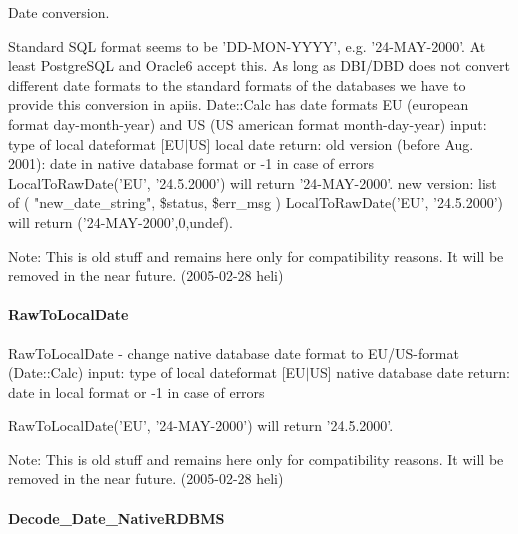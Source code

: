 Date conversion.



Standard SQL format seems to be 'DD-MON-YYYY', e.g. '24-MAY-2000'. At
least PostgreSQL and Oracle6 accept this.
As long as DBI/DBD does not convert different date formats to the standard
formats of the databases we have to provide this conversion in apiis.
Date::Calc has date formats EU (european format day-month-year) and US
(US american format month-day-year)
   input:  type of local dateformat [EU$|$US]
           local date
   return: old version (before Aug. 2001):
           date in native database format or -1 in case of errors
           LocalToRawDate('EU', '24.5.2000') will return '24-MAY-2000'.
           new version:
           list of ( "new\_date\_string", \$status, \$err\_msg )
           LocalToRawDate('EU', '24.5.2000') will return ('24-MAY-2000',0,undef).



Note: This is old stuff and remains here only for compatibility reasons. It
will be removed in the near future. (2005-02-28 heli)

\paragraph*{RawToLocalDate\label{Apiis::Misc_--_Provides_some_usefull_subroutines_mainly_for_compatibility_reasons_RawToLocalDate}}


RawToLocalDate - change native database date format to EU/US-format (Date::Calc)
   input:  type of local dateformat [EU$|$US]
           native database date
   return: date in local format or -1 in case of errors



RawToLocalDate('EU', '24-MAY-2000') will return '24.5.2000'.



Note: This is old stuff and remains here only for compatibility reasons. It
will be removed in the near future. (2005-02-28 heli)

\paragraph*{Decode\_Date\_NativeRDBMS\label{Apiis::Misc_--_Provides_some_usefull_subroutines_mainly_for_compatibility_reasons_Decode_Date_NativeRDBMS}}


